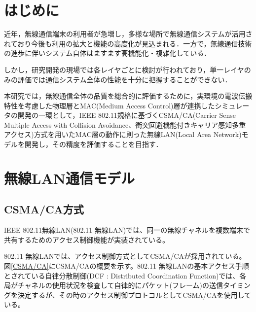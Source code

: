 \documentclass[a4paper,10pt]{ltjsarticle}
\begin{document}

\tableofcontents
\thispagestyle{empty}



\clearpage
\setcounter{page}{1}

\section{はじめに}

近年，無線通信端末の利用者が急増し，多様な場所で無線通信システムが活用されており今後も利用の拡大と機能の高度化が見込まれる．一方で，無線通信技術の進歩に伴いシステム自体はますます高機能化・複雑化している．

しかし，研究開発の現場では各レイヤごとに検討が行われており，単一レイヤのみの評価では通信システム全体の性能を十分に把握することができない．

本研究では，無線通信全体の品質を総合的に評価するために，実環境の電波伝搬特性を考慮した物理層とMAC(Medium Access Control)層が連携したシミュレータの開発の一環として，IEEE 802.11規格に基づくCSMA/CA(Carrier Sense Multiple Access with Collision Avoidance、衝突回避機能付きキャリア感知多重アクセス)方式を用いたMAC層の動作に則った無線LAN(Local Area Network)モデルを開発し，その精度を評価することを目指す．


\clearpage
\section{無線LAN通信モデル}

\subsection{CSMA/CA方式}

IEEE 802.11無線LAN(802.11 無線LAN)では、同一の無線チャネルを複数端末で共有するためのアクセス制御機能が実装されている。

802.11 無線LANでは、アクセス制御方式としてCSMA/CAが採用されている。図\ref{CSMA/CA}にCSMA/CAの概要を示す。802.11 無線LANの基本アクセス手順とされている自律分散制御(DCF : Distributed Coordination Function)では、各局がチャネルの使用状況を検査して自律的にパケット(フレーム)の送信タイミングを決定するが、その時のアクセス制御プロトコルとしてCSMA/CAを使用している。
\end{document}
